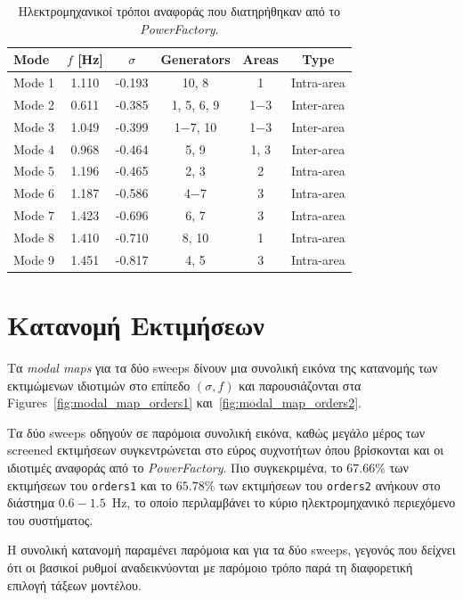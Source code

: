 \documentclass[a4paper,12pt,twoside,openright]{report}
\begin{document}
\begin{table}[htbp]
    \centering
    \caption{Ηλεκτρομηχανικοί τρόποι αναφοράς που διατηρήθηκαν από το \textit{PowerFactory}.}
    \label{tab:pf_reference_modes}
    \scriptsize
    \begin{tabular}{lccccc}
        \toprule
        \textbf{Mode} & \textbf{$f$ [Hz]} & \textbf{$\sigma$} & \textbf{Generators} & \textbf{Areas} & \textbf{Type} \\
        \midrule
        Mode 1  & 1.110 & -0.193 & 10, 8 & 1 & Intra-area\\
        Mode 2 & 0.611 & -0.385 & 1, 5, 6, 9& 1$-$3 & Inter-area\\
        Mode 3 & 1.049 & -0.399 & 1$-$7, 10 & 1$-$3 & Inter-area\\
        Mode 4 & 0.968 & -0.464 & 5, 9 & 1, 3 & Inter-area\\
        Mode 5 & 1.196 & -0.465 & 2, 3 & 2 & Intra-area \\
        Mode 6 & 1.187 & -0.586 & 4$-$7& 3 & Intra-area \\
        Mode 7 & 1.423 & -0.696 & 6, 7 & 3 & Intra-area\\
        Mode 8 & 1.410 & -0.710 & 8, 10 & 1 & Intra-area\\
        Mode 9 & 1.451 & -0.817 & 4, 5 & 3 & Intra-area\\
        \bottomrule
    \end{tabular}
\end{table}

\section{Κατανομή Εκτιμήσεων}
Τα \textit{modal maps} για τα δύο sweeps δίνουν μια συνολική εικόνα της κατανομής των εκτιμώμενων ιδιοτιμών στο επίπεδο $(\sigma, f)$ και παρουσιάζονται στα Figures~\ref{fig:modal_map_orders1} και~\ref{fig:modal_map_orders2}. 

Τα δύο sweeps οδηγούν σε παρόμοια συνολική εικόνα, καθώς μεγάλο μέρος των screened εκτιμήσεων συγκεντρώνεται στο εύρος συχνοτήτων όπου βρίσκονται και οι ιδιοτιμές αναφοράς από το \textit{PowerFactory}. Πιο συγκεκριμένα, το \(67.66\%\) των εκτιμήσεων του \texttt{orders1} και το \(65.78\%\) των εκτιμήσεων του \texttt{orders2} ανήκουν στο διάστημα \(0.6{-}1.5\)~Hz, το οποίο περιλαμβάνει το κύριο ηλεκτρομηχανικό περιεχόμενο του συστήματος.

Η συνολική κατανομή παραμένει παρόμοια και για τα δύο sweeps, γεγονός που δείχνει ότι οι βασικοί ρυθμοί αναδεικνύονται με παρόμοιο τρόπο παρά τη διαφορετική επιλογή τάξεων μοντέλου.
\end{document}
